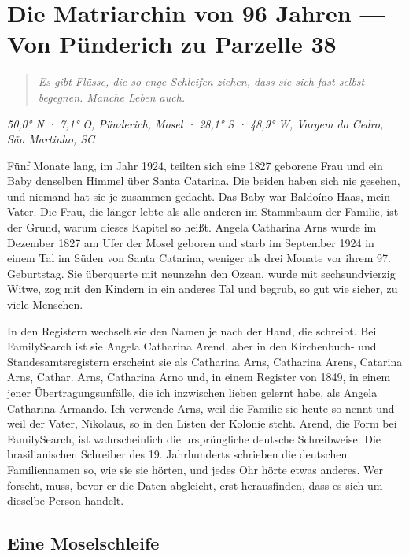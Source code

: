 \documentclass[
  ngerman,
  11pt,
  openany]{book}
\begin{document}
\chapter{Die Matriarchin von 96 Jahren --- Von Pünderich zu Parzelle
38}\label{cap-9}

\begin{quote}
\emph{Es gibt Flüsse, die so enge Schleifen ziehen, dass sie sich fast
selbst begegnen. Manche Leben auch.}
\end{quote}

\emph{50,0° N · 7,1° O, Pünderich, Mosel · 28,1° S · 48,9° W, Vargem do
Cedro, São Martinho, SC}

Fünf Monate lang, im Jahr 1924, teilten sich eine 1827 geborene Frau und
ein Baby denselben Himmel über Santa Catarina. Die beiden haben sich nie
gesehen, und niemand hat sie je zusammen gedacht. Das Baby war Baldoíno
Haas, mein Vater. Die Frau, die länger lebte als alle anderen im
Stammbaum der Familie, ist der Grund, warum dieses Kapitel so heißt.
Angela Catharina Arns wurde im Dezember 1827 am Ufer der Mosel geboren
und starb im September 1924 in einem Tal im Süden von Santa Catarina,
weniger als drei Monate vor ihrem 97. Geburtstag. Sie überquerte mit
neunzehn den Ozean, wurde mit sechsundvierzig Witwe, zog mit den Kindern
in ein anderes Tal und begrub, so gut wie sicher, zu viele Menschen.

In den Registern wechselt sie den Namen je nach der Hand, die schreibt.
Bei FamilySearch ist sie Angela Catharina Arend, aber in den
Kirchenbuch- und Standesamtsregistern erscheint sie als Catharina Arns,
Catharina Arens, Catarina Arns, Cathar. Arns, Catharina Arno und, in
einem Register von 1849, in einem jener Übertragungsunfälle, die ich
inzwischen lieben gelernt habe, als Angela Catharina Armando. Ich
verwende Arns, weil die Familie sie heute so nennt und weil der Vater,
Nikolaus, so in den Listen der Kolonie steht. Arend, die Form bei
FamilySearch, ist wahrscheinlich die ursprüngliche deutsche
Schreibweise. Die brasilianischen Schreiber des 19. Jahrhunderts
schrieben die deutschen Familiennamen so, wie sie sie hörten, und jedes
Ohr hörte etwas anderes. Wer forscht, muss, bevor er die Daten
abgleicht, erst herausfinden, dass es sich um dieselbe Person handelt.

\section{Eine Moselschleife}\label{eine-moselschleife}
\end{document}
